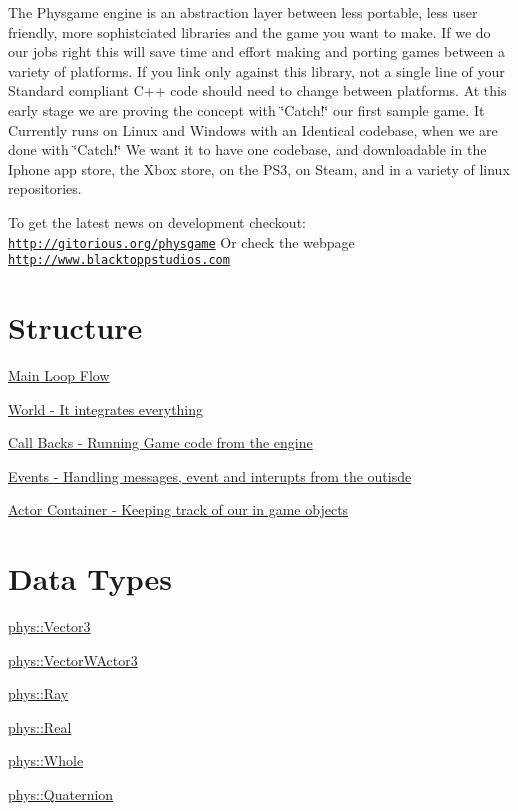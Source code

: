 The Physgame engine is an abstraction layer between less portable, less user friendly, more sophistciated libraries and the game you want to make. If we do our jobs right this will save time and effort making and porting games between a variety of platforms. If you link only against this library, not a single line of your Standard compliant C++ code should need to change between platforms. At this early stage we are proving the concept with \char`\"{}Catch!\char`\"{} our first sample game. It Currently runs on Linux and Windows with an Identical codebase, when we are done with \char`\"{}Catch!\char`\"{} We want it to have one codebase, and downloadable in the Iphone app store, the Xbox store, on the PS3, on Steam, and in a variety of linux repositories.

To get the latest news on development checkout: \href{http://gitorious.org/physgame}{\tt http://gitorious.org/physgame} Or check the webpage \href{http://www.blacktoppstudios.com}{\tt http://www.blacktoppstudios.com}\hypertarget{index_Engine}{}\section{Structure}\label{index_Engine}
\hyperlink{mainloop1}{Main Loop Flow}

\hyperlink{classphys_1_1World}{World -\/ It integrates everything}

\hyperlink{classphys_1_1CallBackManager}{Call Backs -\/ Running Game code from the engine}

\hyperlink{classphys_1_1EventManager}{Events -\/ Handling messages, event and interupts from the outisde}

\hyperlink{actorcontainer1}{Actor Container -\/ Keeping track of our in game objects}\hypertarget{index_Types}{}\section{Data Types}\label{index_Types}
\hyperlink{classphys_1_1Vector3}{phys::Vector3}

\hyperlink{classphys_1_1VectorWActor3}{phys::VectorWActor3}

\hyperlink{classphys_1_1Ray}{phys::Ray}

\hyperlink{namespacephys_af7eb897198d265b8e868f45240230d5f}{phys::Real}

\hyperlink{namespacephys_a460f6bc24c8dd347b05e0366ae34f34a}{phys::Whole}

\hyperlink{classphys_1_1Quaternion}{phys::Quaternion}

